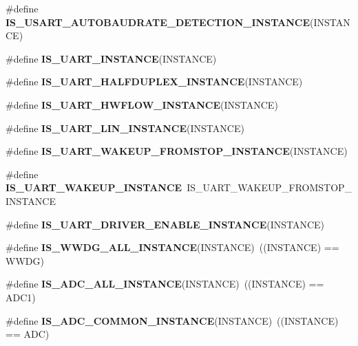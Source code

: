 \begin{DoxyCompactItemize}
\#define {\bfseries I\+S\+\_\+\+U\+S\+A\+R\+T\+\_\+\+A\+U\+T\+O\+B\+A\+U\+D\+R\+A\+T\+E\+\_\+\+D\+E\+T\+E\+C\+T\+I\+O\+N\+\_\+\+I\+N\+S\+T\+A\+N\+CE}(I\+N\+S\+T\+A\+N\+CE)
\item 
\#define {\bfseries I\+S\+\_\+\+U\+A\+R\+T\+\_\+\+I\+N\+S\+T\+A\+N\+CE}(I\+N\+S\+T\+A\+N\+CE)
\item 
\#define {\bfseries I\+S\+\_\+\+U\+A\+R\+T\+\_\+\+H\+A\+L\+F\+D\+U\+P\+L\+E\+X\+\_\+\+I\+N\+S\+T\+A\+N\+CE}(I\+N\+S\+T\+A\+N\+CE)
\item 
\#define {\bfseries I\+S\+\_\+\+U\+A\+R\+T\+\_\+\+H\+W\+F\+L\+O\+W\+\_\+\+I\+N\+S\+T\+A\+N\+CE}(I\+N\+S\+T\+A\+N\+CE)
\item 
\#define {\bfseries I\+S\+\_\+\+U\+A\+R\+T\+\_\+\+L\+I\+N\+\_\+\+I\+N\+S\+T\+A\+N\+CE}(I\+N\+S\+T\+A\+N\+CE)
\item 
\#define {\bfseries I\+S\+\_\+\+U\+A\+R\+T\+\_\+\+W\+A\+K\+E\+U\+P\+\_\+\+F\+R\+O\+M\+S\+T\+O\+P\+\_\+\+I\+N\+S\+T\+A\+N\+CE}(I\+N\+S\+T\+A\+N\+CE)
\item 
\mbox{\label{group___exported__macro_ga69e32d838272d886316fcfa378605ed0}} 
\#define {\bfseries I\+S\+\_\+\+U\+A\+R\+T\+\_\+\+W\+A\+K\+E\+U\+P\+\_\+\+I\+N\+S\+T\+A\+N\+CE}~I\+S\+\_\+\+U\+A\+R\+T\+\_\+\+W\+A\+K\+E\+U\+P\+\_\+\+F\+R\+O\+M\+S\+T\+O\+P\+\_\+\+I\+N\+S\+T\+A\+N\+CE
\item 
\#define {\bfseries I\+S\+\_\+\+U\+A\+R\+T\+\_\+\+D\+R\+I\+V\+E\+R\+\_\+\+E\+N\+A\+B\+L\+E\+\_\+\+I\+N\+S\+T\+A\+N\+CE}(I\+N\+S\+T\+A\+N\+CE)
\item 
\mbox{\label{group___exported__macro_gac2a8aaec233e19987232455643a04d6f}} 
\#define {\bfseries I\+S\+\_\+\+W\+W\+D\+G\+\_\+\+A\+L\+L\+\_\+\+I\+N\+S\+T\+A\+N\+CE}(I\+N\+S\+T\+A\+N\+CE)~((I\+N\+S\+T\+A\+N\+CE) == W\+W\+DG)
\item 
\mbox{\label{group___exported__macro_ga2204b62b378bcf08b3b9006c184c7c23}} 
\#define {\bfseries I\+S\+\_\+\+A\+D\+C\+\_\+\+A\+L\+L\+\_\+\+I\+N\+S\+T\+A\+N\+CE}(I\+N\+S\+T\+A\+N\+CE)~((I\+N\+S\+T\+A\+N\+CE) == A\+D\+C1)
\item 
\mbox{\label{group___exported__macro_gad8a5831c786b6b265531b890a194cbe2}} 
\#define {\bfseries I\+S\+\_\+\+A\+D\+C\+\_\+\+C\+O\+M\+M\+O\+N\+\_\+\+I\+N\+S\+T\+A\+N\+CE}(I\+N\+S\+T\+A\+N\+CE)~((I\+N\+S\+T\+A\+N\+CE) == A\+DC)

\end{DoxyCompactItemize}
